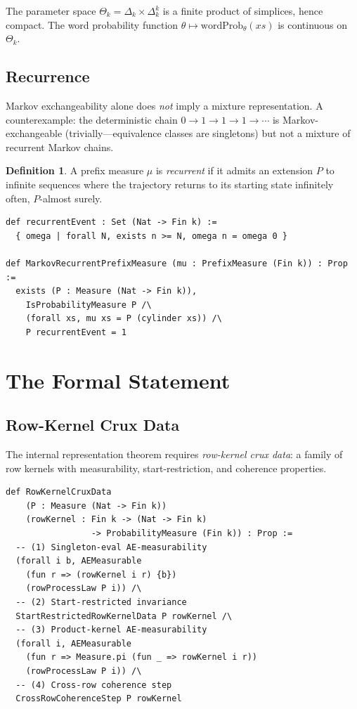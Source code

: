 \documentclass[11pt,a4paper]{article}
\theoremstyle{definition}
\newtheorem{definition}{Definition}[section]
\begin{document}
The parameter space $\Theta_k = \Delta_k \times \Delta_k^k$ is a finite product
of simplices, hence compact. The word probability function
$\theta \mapsto \mathrm{wordProb}_\theta(xs)$ is continuous on $\Theta_k$.

\subsection{Recurrence}

Markov exchangeability alone does \emph{not} imply a mixture representation.
A counterexample: the deterministic chain $0 \to 1 \to 1 \to 1 \to \cdots$
is Markov-exchangeable (trivially---equivalence classes are singletons) but
not a mixture of recurrent Markov chains.

\begin{definition}
A prefix measure $\mu$ is \emph{recurrent} if it admits an extension $P$ to
infinite sequences where the trajectory returns to its starting state
infinitely often, $P$-almost surely.
\end{definition}

\begin{lstlisting}
def recurrentEvent : Set (Nat -> Fin k) :=
  { omega | forall N, exists n >= N, omega n = omega 0 }

def MarkovRecurrentPrefixMeasure (mu : PrefixMeasure (Fin k)) : Prop :=
  exists (P : Measure (Nat -> Fin k)),
    IsProbabilityMeasure P /\
    (forall xs, mu xs = P (cylinder xs)) /\
    P recurrentEvent = 1
\end{lstlisting}

\section{The Formal Statement}

\subsection{Row-Kernel Crux Data}

The internal representation theorem requires \emph{row-kernel crux data}:
a family of row kernels with measurability, start-restriction, and coherence
properties.

\begin{lstlisting}
def RowKernelCruxData
    (P : Measure (Nat -> Fin k))
    (rowKernel : Fin k -> (Nat -> Fin k)
                 -> ProbabilityMeasure (Fin k)) : Prop :=
  -- (1) Singleton-eval AE-measurability
  (forall i b, AEMeasurable
    (fun r => (rowKernel i r) {b})
    (rowProcessLaw P i)) /\
  -- (2) Start-restricted invariance
  StartRestrictedRowKernelData P rowKernel /\
  -- (3) Product-kernel AE-measurability
  (forall i, AEMeasurable
    (fun r => Measure.pi (fun _ => rowKernel i r))
    (rowProcessLaw P i)) /\
  -- (4) Cross-row coherence step
  CrossRowCoherenceStep P rowKernel
\end{lstlisting}
\end{document}
